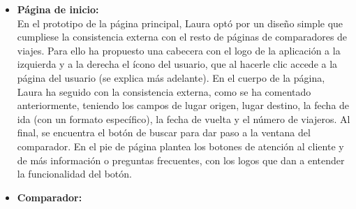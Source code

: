 \begin{itemize}
      \item\textbf{Página de inicio:} \\ En el prototipo de la página principal, Laura optó por un diseño simple que cumpliese la consistencia externa con el resto de páginas de comparadores de viajes. Para ello ha propuesto una cabecera con el logo de la aplicación a la izquierda y a la derecha el ícono del usuario, que al hacerle clic accede a la página del usuario (se explica más adelante).
            En el cuerpo de la página, Laura ha seguido con la consistencia externa, como se ha comentado anteriormente, teniendo los campos de lugar origen, lugar destino, la fecha de ida (con un formato específico), la fecha de vuelta y el número de viajeros. Al final, se encuentra el botón de buscar para dar paso a la ventana del comparador.
            En el pie de página plantea los botones de atención al cliente y de más información o preguntas frecuentes, con los logos que dan a entender la funcionalidad del botón.

      \item\textbf{Comparador:} \\


\end{itemize}
